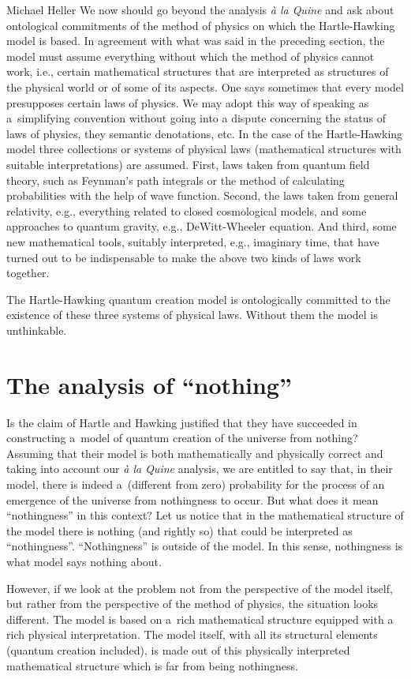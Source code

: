 \begin{artengenv}{Michael Heller}
We now should go beyond the analysis \textit{à la Quine} and ask about ontological commitments of the method of
physics on which the Hartle-Hawking model is based. In agreement with what was said in the preceding section, the model
must assume everything without which the method of physics cannot work, i.e., certain mathematical structures that are
interpreted as structures of the physical world or of some of its aspects. One says sometimes that every model
presupposes certain laws of physics. We may adopt this way of speaking as a~simplifying convention without going into a
dispute concerning the status of laws of physics, they semantic denotations, etc. In the case of the Hartle-Hawking
model three collections or systems of physical laws (mathematical structures with suitable interpretations) are
assumed. First, laws taken from quantum field theory, such as Feynman’s path integrals or the method of calculating
probabilities with the help of wave function. Second, the laws taken from general relativity, e.g., everything related
to closed cosmological models, and some approaches to quantum gravity, e.g., DeWitt-Wheeler equation. And third, some
new mathematical tools, suitably interpreted, e.g., imaginary time, that have turned out to be indispensable to make
the above two kinds of laws work together.

The Hartle-Hawking quantum creation model is ontologically committed to the existence of these three systems of
physical laws. Without them the model is unthinkable.

\section{The analysis of ``nothing''}
Is the claim of Hartle and Hawking justified that they have succeeded in constructing a~model of quantum creation of the
universe from nothing? Assuming that their model is both mathematically and physically correct and taking into account
our \textit{à la Quine} analysis, we are entitled to say that, in their model, there is indeed a~(different from zero)
probability for the process of an emergence of the universe from nothingness to occur. But what does it mean
``nothingness'' in this context? Let us notice that in the mathematical structure of the model there is nothing (and
rightly so) that could be interpreted as ``nothingness''. ``Nothingness'' is outside of the model. In this sense,
nothingness is what model says nothing about.

However, if we look at the problem not from the perspective of the model itself, but rather from the perspective of
the method of physics, the situation looks different. The model is based on a~rich mathematical structure equipped with
a rich physical interpretation. The model itself, with all its structural elements (quantum creation included), is made
out of this physically interpreted mathematical structure which is far from being nothingness.


\end{artengenv}
